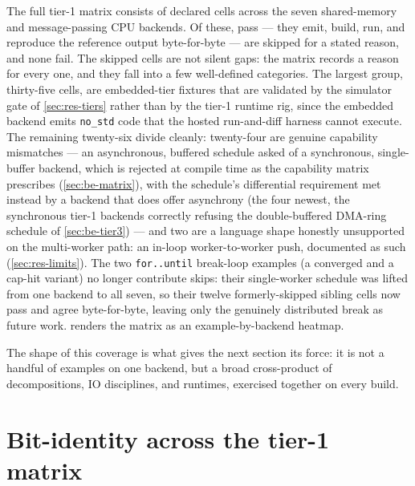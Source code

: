 The full tier-1 matrix consists of \nmatrixtotal{} declared cells across the seven
shared-memory and message-passing CPU backends. Of these, \nmatrixpass{} pass ---
they emit, build, run, and reproduce the reference output byte-for-byte ---
\nmatrixskip{} are skipped for a stated reason, and none fail. The skipped cells are
not silent gaps: the matrix records a reason for every one, and they fall into a few
well-defined categories. The largest group, thirty-five cells, are embedded-tier fixtures
that are validated by the simulator gate of \cref{sec:res-tiers} rather than by the
tier-1 runtime rig, since the embedded backend emits \texttt{no\_std} code that the
hosted run-and-diff harness cannot execute. The remaining twenty-six divide cleanly: twenty-four are genuine capability
mismatches --- an asynchronous, buffered schedule asked of a synchronous,
single-buffer backend, which is rejected at compile time as the capability matrix
prescribes (\cref{sec:be-matrix}), with the schedule's differential requirement met
instead by a backend that does offer asynchrony (the four newest, the synchronous
tier-1 backends correctly refusing the double-buffered DMA-ring schedule of
\cref{sec:be-tier3}) --- and two are a language shape
honestly unsupported on the multi-worker path: an in-loop
worker-to-worker push, documented as such
(\cref{sec:res-limits}). The two \texttt{for..until} break-loop examples
(a converged and a cap-hit variant) no longer contribute skips: their single-worker
schedule was lifted from one backend to all seven, so their twelve formerly-skipped
sibling cells now pass and agree byte-for-byte, leaving only the genuinely distributed
break as future work.  renders the matrix as an
example-by-backend heatmap.



The shape of this coverage is what gives the next section its force: it is not a
handful of examples on one backend, but a broad cross-product of decompositions,
IO disciplines, and runtimes, exercised together on every build.

\section{Bit-identity across the tier-1 matrix}\label{sec:res-bitidentity}

